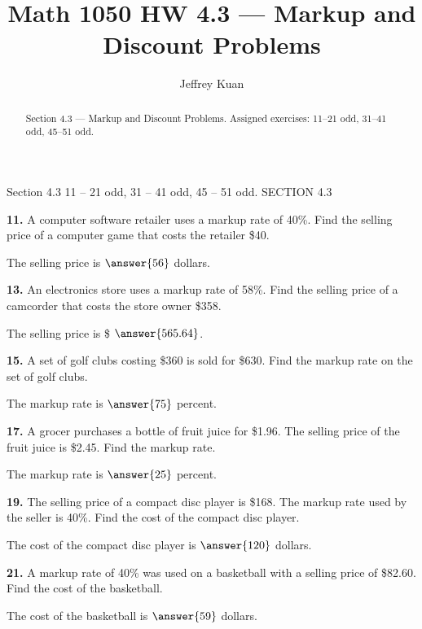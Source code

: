 \documentclass{ximera}
\author{Jeffrey Kuan}
\title{Math 1050 HW 4.3 --- Markup and Discount Problems}
\begin{document}
\begin{abstract}
    Section 4.3 --- Markup and Discount Problems.
    Assigned exercises: 11–21 odd, 31–41 odd, 45–51 odd.
\end{abstract}

\maketitle

Section 4.3 11 – 21 odd, 31 – 41 odd, 45 – 51 odd. SECTION 4.3

\begin{problem}
\textbf{11.} A computer software retailer uses a markup rate of 40\%. Find the selling price
  of a computer game that costs the retailer \$40.

The selling price is $\answer{56}$ dollars.
\end{problem}

\begin{problem}
\textbf{13.} An electronics store uses a markup rate of 58\%. Find the selling price of a
  camcorder that costs the store owner \$358.

The selling price is \$ $ \answer{565.64}$.
\end{problem}

\begin{problem}
\textbf{15.} A set of golf clubs costing \$360 is sold for \$630. Find the markup rate on the
  set of golf clubs.

The markup rate is $\answer{75}$ percent.
\end{problem}

\begin{problem}
\textbf{17.} A grocer purchases a bottle of fruit juice for \$1.96. The selling price of the
  fruit juice is \$2.45. Find the markup rate.

The markup rate is $\answer{25}$ percent.
\end{problem}

\begin{problem}
\textbf{19.} The selling price of a compact disc player is \$168. The markup rate used by the
  seller is 40\%. Find the cost of the compact disc player.

The cost of the compact disc player is $\answer{120}$ dollars.
\end{problem}

\begin{problem}
\textbf{21.} A markup rate of 40\% was used on a basketball with a selling price of \$82.60.
  Find the cost of the basketball.

The cost of the basketball is $\answer{59}$ dollars.
\end{problem}
\end{document}
